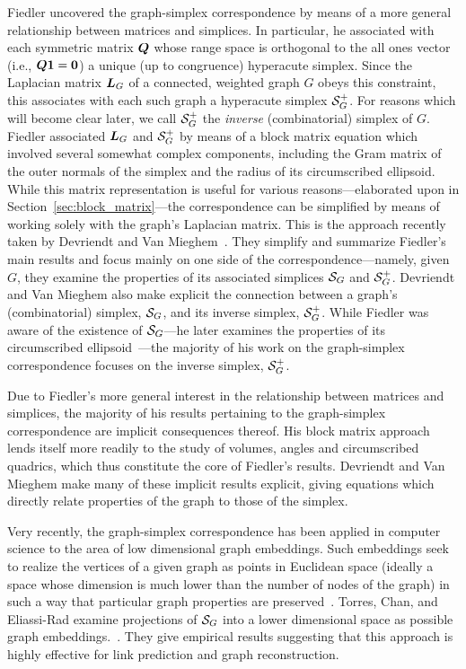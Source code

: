 Fiedler uncovered  the graph-simplex correspondence by means of  a more general  relationship between matrices and simplices.  In particular, he associated with each symmetric matrix $\vb*{Q}$ whose range space is orthogonal to the all ones vector (i.e.,  $\vb*{Q}\vb{1}=\vb{0}$) a unique (up to congruence) hyperacute simplex. Since the Laplacian  matrix  $\vb*{L}_G$ of a connected, weighted graph  $G$ obeys this constraint, this associates with  each such graph a hyperacute simplex  $\mathcal{S}_G^+$.   
For  reasons which will become clear later, we call $\mathcal{S}_G^+$ the \emph{inverse} (combinatorial) simplex of $G$. 
Fiedler associated $\vb*{L}_G$ and $\mathcal{S}_G^+$  by means of a block matrix equation which involved several somewhat complex components, including  the Gram matrix of the outer normals of the simplex and  the radius of its circumscribed ellipsoid. While this matrix representation is useful for various reasons---elaborated upon in  Section~\ref{sec:block_matrix}---the correspondence can  be simplified  by means of working solely  with the graph's Laplacian  matrix. This is the approach  recently taken by Devriendt  and  Van  Mieghem~\cite{devriendt2018simplex}. They simplify and summarize Fiedler's main  results and focus mainly on one  side of the correspondence---namely,  given $G$,  they examine  the properties of  its associated  simplices $\mathcal{S}_G$ and $\mathcal{S}_G^+$. 
Devriendt and  Van Mieghem also make explicit the connection between a graph's (combinatorial) simplex, $\mathcal{S}_G$, and  its  inverse  simplex, $\mathcal{S}_G^+$. While Fiedler was aware  of the existence of  $\mathcal{S}_G$---he later examines the properties of its circumscribed ellipsoid~\cite{fiedler2005geometry}---the  majority of his  work on  the graph-simplex  correspondence focuses on the inverse simplex, $\mathcal{S}_G^+$. 

Due to Fiedler's more general interest in the relationship between matrices and simplices, the majority of  his  results pertaining  to the graph-simplex correspondence are implicit consequences thereof. His block matrix approach lends itself more readily to the study of volumes, angles and circumscribed quadrics, which thus constitute the core of Fiedler's results. Devriendt and Van Mieghem make many of these implicit results explicit, giving equations which directly relate properties of the  graph to those of the simplex. 
 
Very recently, the graph-simplex correspondence has been applied in  computer science to  the area of low dimensional graph embeddings. Such embeddings seek to realize the vertices of a given graph as points in Euclidean space  (ideally a space whose dimension is much  lower than the number of nodes of the  graph)  in such a way that particular graph properties are preserved~\cite{cai2018comprehensive}. 
Torres, Chan, and Eliassi-Rad examine
projections of $\mathcal{S}_G$ into a lower dimensional space as possible graph  embeddings.~\cite{torres2019geometric}. They give empirical results suggesting that this approach is highly effective for link prediction  and graph  reconstruction. 

